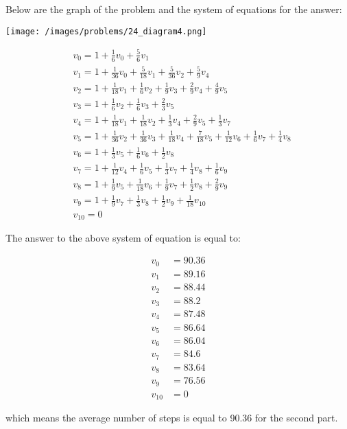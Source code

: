 \begin{solution}
Below are the graph of the problem and the system of equations for the answer:

\begin{center}
	\texttt{[image: /images/problems/24\_diagram4.png]}
\end{center}


$$
\begin{aligned}
&v_0 = 1 + \frac{1}{6}v_0 + \frac{5}{6}v_1 \\
&v_1 = 1 + \frac{1}{36}v_0 + \frac{5}{18}v_1 + \frac{5}{36}v_2 + \frac{5}{9}v_4 \\
&v_2 = 1 + \frac{1}{18}v_1 + \frac{1}{6}v_2 + \frac{1}{9}v_3 + \frac{2}{9}v_4 + \frac{4}{ 9}v_5 \\
&v_3 = 1 + \frac{1}{6}v_2 + \frac{1}{6}v_3 + \frac{2}{3}v_5 \\
&v_4 = 1 + \frac{1}{18}v_1 + \frac{1}{18}v_2 + \frac{1}{3}v_4 + \frac{2}{9}v_5 + \frac{1}{ 3}v_7 \\
&v_5 = 1 + \frac{1}{36}v_2 + \frac{1}{36}v_3 + \frac{1}{18}v_4 + \frac{7}{18}v_5 + \frac{1}{ 12}v_6 + \frac{1}{6}v_7 + \frac{1}{4}v_8 \\
&v_6 = 1 + \frac{1}{3}v_5 + \frac{1}{6}v_6 + \frac{1}{2}v_8 \\
&v_7 = 1 + \frac{1}{12}v_4 + \frac{1}{6}v_5 + \frac{1}{3}v_7 + \frac{1}{4}v_8 + \frac{1}{ 6}v_9 \\
&v_8 = 1 + \frac{1}{9}v_5 + \frac{1}{18}v_6 + \frac{1}{9}v_7 + \frac{1}{2}v_8 + \frac{2}{ 9}v_9 \\
&v_9 = 1 + \frac{1}{9}v_7 + \frac{1}{3}v_8 + \frac{1}{2}v_9 + \frac{1}{18}v_{10} \\
&v_{10} = 0
\end{aligned}
$$

The answer to the above system of equation is equal to:

$$
\begin{aligned}
v_0 &= 90.36 \\
v_1 &= 89.16 \\
v_2 &= 88.44 \\
v_3 &= 88.2 \\
v_4 &= 87.48 \\
v_5 &= 86.64 \\
v_6 &= 86.04 \\
v_7 &= 84.6 \\
v_8 &= 83.64 \\
v_9 &= 76.56 \\
v_{10} &= 0
\end{aligned}
$$

which means the average number of steps is equal to 90.36 for the second part.




\end{solution}